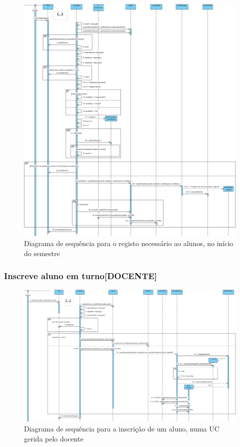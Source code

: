 \documentclass[a4paper]{article}
\begin{document}
\begin{figure}[H]
\centering
\includegraphics[width=14cm]{SEQEfetuarRegisto}
\caption{Diagrama de sequência para o registo necessário ao alunos, no início do semestre}
\label{}
\end{figure}

\subsubsection{Inscreve aluno em turno[DOCENTE]}

\begin{figure}[H]
\centering
\includegraphics[width=14cm]{SEQInscreverAlunoTurno(peloDocente)}
\caption{Diagrama de sequência para a inscrição de um aluno, numa UC gerida pelo docente}
\label{}
\end{figure}
\end{document}
